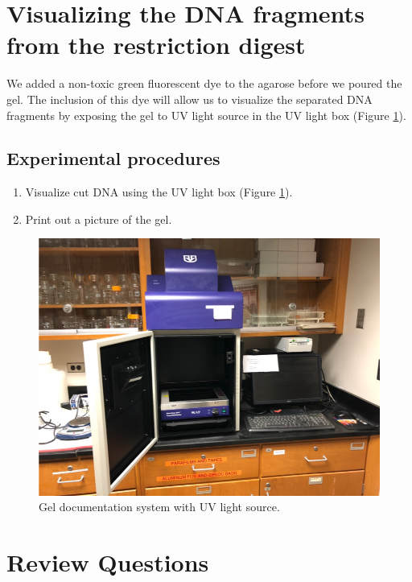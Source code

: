 \section{Visualizing the DNA fragments from the restriction digest}\label{visualizing-the-dna-fragments-from-the-restriction-digest}

We added a non-toxic green fluorescent dye to the agarose before we poured the gel. The inclusion of this dye will allow us to visualize the separated DNA fragments by exposing the gel to UV light source in the UV light box (Figure \ref{fig:doc}).

\subsection{Experimental procedures}\label{experimental-procedures-34}

\begin{enumerate}
\def\labelenumi{\arabic{enumi}.}
\tightlist
\item
  Visualize cut DNA using the UV light box (Figure \ref{fig:doc}).
\item
  Print out a picture of the gel.
\end{enumerate}

\begin{figure}

{\centering \includegraphics[width=0.7\linewidth]{./figures/molbio/Gel_doc} 

}

\caption{Gel documentation system with UV light source.}\label{fig:doc}
\end{figure}

\section{Review Questions}\label{review-questions-8}

